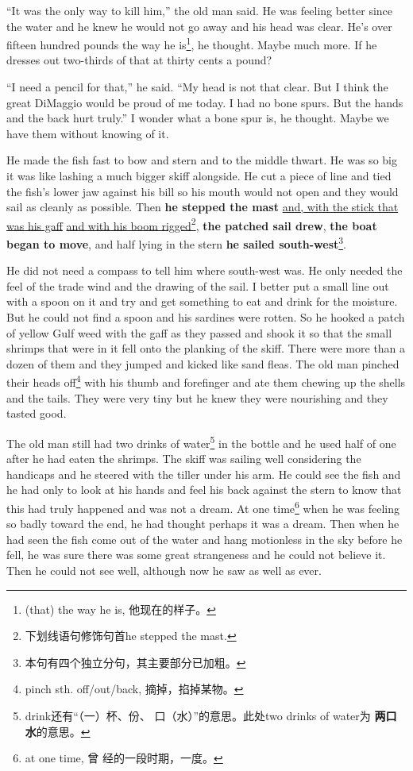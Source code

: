 \documentclass[fontset=ubuntu]{ctexrep}
\begin{document}
``It was the only way to kill him,'' the old man said. He was feeling better
since the water and he knew he would not go away and his head was clear.
He's over fifteen hundred pounds the way he is\footnote{(that) the way he
  is, 他现在的样子。}, he thought. Maybe much more. If he dresses out
two-thirds of that at thirty cents a pound?

``I need a pencil for that,'' he said. ``My head is not that clear. But I
think the great DiMaggio would be proud of me today. I had no bone spurs.
But the hands and the back hurt truly.'' I wonder what a bone spur is, he
thought. Maybe we have them without knowing of it.

He made the fish fast to bow and stern and to the middle thwart. He was so
big it was like lashing a much bigger skiff alongside. He cut a piece of
line and tied the fish's lower jaw against his bill so his mouth would not
open and they would sail as cleanly as possible. Then \textbf{he stepped the
  mast} \uline{and, with the stick that was his gaff} \uline{and with his boom
  rigged}\footnote{下划线语句修饰句首he stepped the mast.}, \textbf{the
  patched sail drew}, \textbf{the boat began to move}, and half lying in the
stern \textbf{he sailed south-west}\footnote{本句有四个独立分句，其主要部分已加粗。}.

He did not need a \gls{compass} to tell him where south-west was. He only
needed the feel of the trade wind and the drawing of the sail. I better put
a small line out with a spoon on it and try and get something to eat
and drink for the \gls{moisture}. But he could not find a spoon and his
sardines were rotten. So he hooked a patch of yellow Gulf weed with the gaff
as they passed and shook it so that the small shrimps that were in it fell
onto the planking of the skiff. There were more than a dozen of them and
they jumped and kicked like sand \glspl{flea}. The old man \gls{pinched}
their heads off\footnote{pinch sth. off/out/back, 摘掉，掐掉某物。} with his
thumb and forefinger and ate them chewing up the shells and the tails. They
were very tiny but he knew they were \gls{nourishing} and they tasted good.

The old man still had two drinks of water\footnote{drink还有“（一）杯、份、
  口（水）”的意思。此处two drinks of water为 \textbf{两口水}的意思。} in
the bottle and he used half of one after he had eaten the shrimps. The skiff
was sailing well considering the \glspl{handicap} and he \gls{steered}
with the \gls{tiller} under his arm. He could see the fish and he had only
to look at his hands and feel his back against the stern to know that this
had truly happened and was not a dream. At one time\footnote{at one time, 曾
  经的一段时期，一度。} when he was feeling so badly toward the end, he had
thought perhaps it was a dream. Then when he had seen the fish come out of
the water and hang \gls{motionless} in the sky before he fell, he was sure
there was some great \gls{strangeness} and he could not believe it. Then
he could not see well, although now he saw as well as ever.
\end{document}
